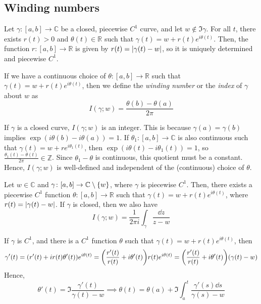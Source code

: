 \subsection{Winding numbers}
Let \( \gamma \colon [a,b] \to \mathbb C \) be a closed, piecewise \( C^1 \) curve, and let \( w \not\in \Im \gamma \).
For all \( t \), there exists \( r(t) > 0 \) and \( \theta(t) \in \mathbb R \) such that \( \gamma(t) = w + r(t) e^{i\theta(t)} \).
Then, the function \( r \colon [a,b] \to \mathbb R \) is given by \( r(t) = \abs{\gamma(t) - w} \), so it is uniquely determined and piecewise \( C^1 \).
\begin{definition}
	If we have a continuous choice of \( \theta \colon [a,b] \to \mathbb R \) such that \( \gamma(t) = w + r(t) e^{i\theta(t)} \), then we define the \textit{winding number} or the \textit{index} of \( \gamma \) about \( w \) as
	\[
		I(\gamma; w) = \frac{\theta(b) - \theta(a)}{2\pi}
	\]
\end{definition}
If \( \gamma \) is a closed curve, \( I(\gamma;w) \) is an integer.
This is because \( \gamma(a) = \gamma(b) \) implies \( \exp(i\theta(b) - i\theta(a)) = 1 \).
If \( \theta_1 \colon [a,b] \to \mathbb C \) is also continuous such that \( \gamma(t) = w + re^{i\theta_1(t)} \), then \( \exp(i\theta(t) - i\theta_1(t)) = 1 \), so \( \frac{\theta_1(t) - \theta(t)}{2\pi} \in \mathbb Z \).
Since \( \theta_1 - \theta \) is continuous, this quotient must be a constant.
Hence, \( I(\gamma;w) \) is well-defined and independent of the (continuous) choice of \( \theta \).
\begin{lemma}
	Let \( w \in \mathbb C \) and \( \gamma \colon [a,b] \to \mathbb C \setminus \qty{w} \), where \( \gamma \) is piecewise \( C^1 \).
	Then, there exists a piecewise \( C^1 \) function \( \theta \colon [a,b] \to \mathbb R \) such that \( \gamma(t) = w + r(t) e^{i\theta(t)} \), where \( r(t) = \abs{\gamma(t) - w} \).
	If \( \gamma \) is closed, then we also have
	\[
		I(\gamma; w) = \frac{1}{2\pi i} \int_\gamma \frac{\dd{z}}{z-w}
	\]
\end{lemma}
\begin{remark}
	If \( \gamma \) is \( C^1 \), and there is a \( C^1 \) function \( \theta \) such that \( \gamma(t) = w + r(t) e^{i\theta(t)} \), then
	\[
		\gamma'(t) = (r'(t) + ir(t) \theta'(t))e^{i\theta(t)} = \qty(\frac{r'(t)}{r(t)} + i\theta'(t)) r(t) e^{i\theta(t)} = \qty(\frac{r'(t)}{r(t)} + i\theta'(t))(\gamma(t) - w)
	\]
	Hence,
	\[
		\theta'(t) = \Im \frac{\gamma'(t)}{\gamma(t) - w} \implies \theta(t) = \theta(a) + \Im \int_a^t \frac{\gamma'(s) \dd{s}}{\gamma(s) - w}
	\]
\end{remark}
